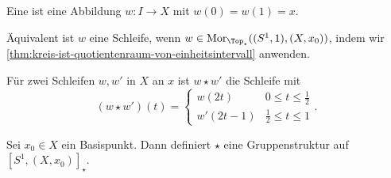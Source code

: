 \begin{definition}[Schleife]\label{def:schleife}
    Eine  ist eine Abbildung $w\colon  I \to  X$ mit $w(0) = w(1) = x$. 

    Äquivalent ist  $w$ eine Schleife, wenn  $w\in \Mor_{\Top_{\star}}((S^1,1), (X,x_0))$, indem wir \autoref{thm:kreis-ist-quotientenraum-von-einheitsintervall} anwenden.
\end{definition}


\begin{definition}\label{def:komposition-von-schleifen}
    Für zwei Schleifen $w,w'$ in  $X$ an  $x$ ist  $w \star w'$ die Schleife mit
     \[
         (w \star w')(t) = \begin{cases}
             w(2t) & 0\leq t\leq \frac{1}{2} \\
             w'(2t-1) & \frac{1}{2}\leq t\leq 1
         \end{cases}
    .\] 
\end{definition}

\begin{theorem}\label{thm:star-ist-gruppenstruktur}
    Sei $x_0\in X$ ein Basispunkt. Dann definiert $\star$ eine Gruppenstruktur auf  $[S^1,(X,x_0)]_{\star}$.
\end{theorem}

